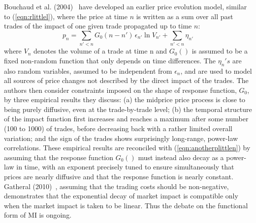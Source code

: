 Bouchaud et al. (2004)~\cite{bouchaud2004} have developed an earlier price evolution model, similar to (\ref{eqn:rlittlel}), where the price at time $n$ is written as a sum over all past trades of the impact of one given trade propagated up to time $n$:
	\begin{equation}\label{eqn:anotherplittlen}
	p_n = \sum_{n'<n} G_0(n-n')\,\epsilon_{n'} \ln{V_{n'}} + \sum_{n'<n} \eta_{n'}
	\end{equation}
where $V_n$ denotes the volume of a trade at time n and $G_0()$ is assumed to be a fixed non-random function that only depends on time differences. The $\eta_n's$ are also random variables, assumed to be independent from $\epsilon_n$, and are used to model all sources of price changes not described by the direct impact of the trades. The authors then consider constraints imposed on the shape of response function, $G_0$, by three empirical results they discuss: (a) the midprice price process is close to being purely diffusive, even at the trade-by-trade level; (b) the temporal structure of the impact function first increases and reaches a maximum after some number (100 to 1000) of trades, before decreasing back with a rather limited overall variation; and the sign of the trades shows surprisingly long-range, power-law correlations. These empirical results are reconciled with (\ref{eqn:anotherplittlen}) by assuming that the response function $G_0()$ must instead also decay as a power-law in time, with an exponent precisely tuned to ensure simultaneously that prices are nearly diffusive and that the response function is nearly constant. Gatheral (2010)~\cite{gatheral}, assuming that the trading costs should be non-negative, demonstrates that the exponential decay of market impact is compatible only when the market impact is taken to be linear. Thus the debate on the functional form of MI is ongoing. 


